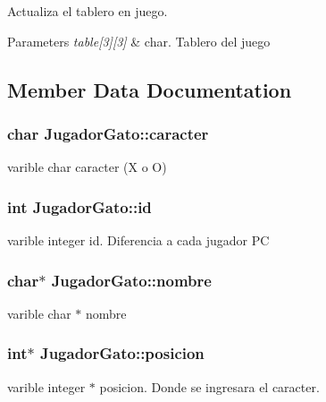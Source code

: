 Actualiza el tablero en juego. 


\begin{DoxyParams}{Parameters}
{\em table\mbox{[}3\mbox{]}\mbox{[}3\mbox{]}} & char. Tablero del juego \\
\hline
\end{DoxyParams}


\subsection{Member Data Documentation}
\subsubsection[{\texorpdfstring{caracter}{caracter}}]{\setlength{\rightskip}{0pt plus 5cm}char Jugador\+Gato\+::caracter\hspace{0.3cm}{\ttfamily [protected]}}\hypertarget{class_jugador_gato_a813bdc504edeb75c4fbbea7209e3f6d8}{}\label{class_jugador_gato_a813bdc504edeb75c4fbbea7209e3f6d8}
varible char caracter (X o O) 
\subsubsection[{\texorpdfstring{id}{id}}]{\setlength{\rightskip}{0pt plus 5cm}int Jugador\+Gato\+::id\hspace{0.3cm}{\ttfamily [protected]}}\hypertarget{class_jugador_gato_a9679414a034dba9d8368f1cd0d0fbc29}{}\label{class_jugador_gato_a9679414a034dba9d8368f1cd0d0fbc29}
varible integer id. Diferencia a cada jugador PC 
\subsubsection[{\texorpdfstring{nombre}{nombre}}]{\setlength{\rightskip}{0pt plus 5cm}char$\ast$ Jugador\+Gato\+::nombre\hspace{0.3cm}{\ttfamily [protected]}}\hypertarget{class_jugador_gato_aadcfaa939882268fd6ccfbbeb1573710}{}\label{class_jugador_gato_aadcfaa939882268fd6ccfbbeb1573710}
varible char $\ast$ nombre 
\subsubsection[{\texorpdfstring{posicion}{posicion}}]{\setlength{\rightskip}{0pt plus 5cm}int$\ast$ Jugador\+Gato\+::posicion\hspace{0.3cm}{\ttfamily [protected]}}\hypertarget{class_jugador_gato_a72bb79fbed6943c62fd54dbb7a8c6ff9}{}\label{class_jugador_gato_a72bb79fbed6943c62fd54dbb7a8c6ff9}
varible integer $\ast$ posicion. Donde se ingresara el caracter. 
